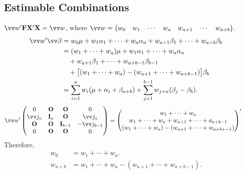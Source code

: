 \subsection*{Estimable Combinations}
$ \Vector{w}'\Matrix{F}\Matrix{X}'\Matrix{X}=\Vector{w} $,
where $ \Vector{w}=\begin{pmatrix}
        w_0 & w_1 & \cdots & w_a & w_{a+1} & \cdots & w_{a+b}
    \end{pmatrix} $.
\begin{align*}
    \Vector{w}'\Vector{\beta}
     & =w_0\mu+w_1\alpha_1+\cdots+w_a\alpha_a+w_{a+1}\beta_1+\cdots+w_{a+b}\beta_b            \\
     & =(w_1+\cdots+w_a)\mu+w_1\alpha_1+\cdots+w_a\alpha_a                                    \\
     & \quad+ w_{a+1}\beta_1+\cdots+w_{a+b-1}\beta_{b-1}                                      \\
     & \quad+\bigl[(w_1+\cdots+w_a)-(w_{a+1}+\cdots+w_{a+b-1})\bigr]\beta_b                   \\
     & =\sum_{i=1}^{a}w_i(\mu+\alpha_i+\beta_{a+b})+\sum_{j=1}^{b-1}w_{j+a}(\beta_j-\beta_b).
\end{align*}
\begin{align*}
    \Vector{w}'\begin{pmatrix}
                   0            & \Matrix{O}   & \Matrix{O}       & 0                 \\
                   \Vector{j}_a & \Matrix{I}_a & \Matrix{O}       & \Vector{j}_a      \\
                   \Matrix{O}   & \Matrix{O}   & \Matrix{I}_{b-1} & -\Vector{j}_{b-1} \\
                   0            & \Matrix{O}   & \Matrix{O}       & 0
               \end{pmatrix}
     & =\begin{pmatrix}
            w_1+\cdots+w_a                          \\
            w_1+\cdots+w_a+w_{a+1}+\cdots+a_{a+b-1} \\
            (w_1+\cdots+w_a)-(w_{a+1}+\cdots+w_{a+b+-1})
        \end{pmatrix}'
\end{align*}
Therefore,
\begin{align*}
    w_0     & =w_1+\cdots+w_a.                            \\
    w_{a+b} & =w_1+\cdots+w_a-(w_{a+1}+\cdots+w_{a+b-1}).
\end{align*}
